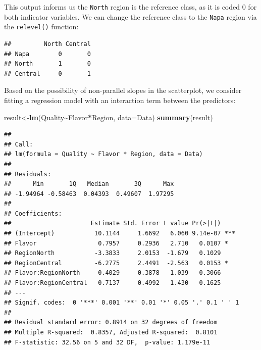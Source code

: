 \documentclass[
]{book}
\newenvironment{Shaded}{\begin{snugshade}}{\end{snugshade}}
\newcommand{\AttributeTok}[1]{\textcolor[rgb]{0.13,0.29,0.53}{#1}}
\newcommand{\DocumentationTok}[1]{\textcolor[rgb]{0.56,0.35,0.01}{\textbf{\textit{#1}}}}
\newcommand{\FunctionTok}[1]{\textcolor[rgb]{0.13,0.29,0.53}{\textbf{#1}}}
\newcommand{\NormalTok}[1]{#1}
\newcommand{\OtherTok}[1]{\textcolor[rgb]{0.56,0.35,0.01}{#1}}
\newcommand{\SpecialCharTok}[1]{\textcolor[rgb]{0.81,0.36,0.00}{\textbf{#1}}}
\newcommand{\StringTok}[1]{\textcolor[rgb]{0.31,0.60,0.02}{#1}}
\begin{document}
This output informs us the \texttt{North} region is the reference class, as it is coded 0 for both indicator variables. We can change the reference class to the \texttt{Napa} region via the \texttt{relevel()} function:

\begin{Shaded}
\end{Shaded}

\begin{verbatim}
##         North Central
## Napa        0       0
## North       1       0
## Central     0       1
\end{verbatim}

Based on the possibility of non-parallel slopes in the scatterplot, we consider fitting a regression model with an interaction term between the predictors:

\begin{Shaded}
\begin{Highlighting}[]
\NormalTok{result}\OtherTok{\textless{}{-}}\FunctionTok{lm}\NormalTok{(Quality}\SpecialCharTok{\textasciitilde{}}\NormalTok{Flavor}\SpecialCharTok{*}\NormalTok{Region, }\AttributeTok{data=}\NormalTok{Data)}
\FunctionTok{summary}\NormalTok{(result)}
\end{Highlighting}
\end{Shaded}

\begin{verbatim}
## 
## Call:
## lm(formula = Quality ~ Flavor * Region, data = Data)
## 
## Residuals:
##      Min       1Q   Median       3Q      Max 
## -1.94964 -0.58463  0.04393  0.49607  1.97295 
## 
## Coefficients:
##                      Estimate Std. Error t value Pr(>|t|)    
## (Intercept)           10.1144     1.6692   6.060 9.14e-07 ***
## Flavor                 0.7957     0.2936   2.710   0.0107 *  
## RegionNorth           -3.3833     2.0153  -1.679   0.1029    
## RegionCentral         -6.2775     2.4491  -2.563   0.0153 *  
## Flavor:RegionNorth     0.4029     0.3878   1.039   0.3066    
## Flavor:RegionCentral   0.7137     0.4992   1.430   0.1625    
## ---
## Signif. codes:  0 '***' 0.001 '**' 0.01 '*' 0.05 '.' 0.1 ' ' 1
## 
## Residual standard error: 0.8914 on 32 degrees of freedom
## Multiple R-squared:  0.8357, Adjusted R-squared:  0.8101 
## F-statistic: 32.56 on 5 and 32 DF,  p-value: 1.179e-11
\end{verbatim}
\end{document}
